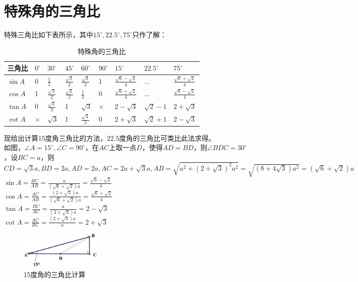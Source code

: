 \documentclass{ecnuthesis}
\begin{document}
\section{特殊角的三角比}
\begin{knowledge}
    特殊三角比如下表所示，其中$15^\circ,22.5^\circ,75^\circ$只作了解：
\end{knowledge}
\begin{table}[H]
\centering
\caption{特殊角的三角比}
\begin{tabular}{l|l|l|l|l|l|l|l|l}
\hline
\hline
三角比 & $0^\circ$ & $30^\circ$ & $45^\circ$ & $60^\circ$ & $90^\circ$ & $15^\circ$ & $22.5^\circ$ & $75^\circ$ \\
\hline
$\sin A$ & 0 & $\frac{1}{2}$ & $\frac{\sqrt 2}{2}$ & $\frac{\sqrt3}{2}$ & 1 & $\frac{\sqrt 6-\sqrt 2}{4}$ & ... & $\frac{\sqrt 6+\sqrt 2}{4}$\\
\hline
$\cos A$ & 1 & $\frac{\sqrt3}{2}$ & $\frac{\sqrt 2}{2}$ & $\frac{1}{2}$ & 0 & $\frac{\sqrt 6+\sqrt 2}{4}$ & ... & $\frac{\sqrt 6-\sqrt 2}{4}$\\
\hline
$\tan A$ & 0 & $\frac{\sqrt3}{3}$ & 1 & $\sqrt3$ & $\times$ & $2-\sqrt 3 $ & $\sqrt2 - 1$ & $2+\sqrt 3$\\
\hline
$\cot A$ & $\times$ & $\sqrt3$ & 1 & $\frac{\sqrt3}{3}$ & 0 & $2+\sqrt 3 $ & $\sqrt2 + 1$ & $2-\sqrt 3$\\
\hline
\hline
\end{tabular}
\end{table}
\begin{knowledge}
    现给出计算15度角三角比的方法，22.5度角的三角比可类比此法求得。\\
    如图，$\angle A=15^\circ,\angle C=90^\circ$，在$AC$上取一点$D$，使得$AD=BD$，则$\angle BDC=30^\circ$，设$BC=a$，则$CD=\sqrt3 a,BD=2a,AD=2a,AC=2a+\sqrt3 a,AB=\sqrt{a^2+(2+\sqrt3)^2a^2}=\sqrt{(8+4\sqrt3)a^2}=(\sqrt6+\sqrt2)a$ \\
    $\sin A=\frac{BC}{AB}=\frac{a}{(\sqrt6+\sqrt2)a}=\frac{\sqrt6-\sqrt2}{4}$ \\
    $\cos A=\frac{AC}{AB}=\frac{(2+\sqrt3)a}{(\sqrt6+\sqrt2)a}=\frac{\sqrt6+\sqrt2}{4}$ \\
    $\tan A=\frac{BC}{AC}=\frac{a}{(2+\sqrt3)a}=2-\sqrt3 $ \\
    $\cot A=\frac{AC}{BC}=\frac{(2+\sqrt3)a}{a}=2+\sqrt3 $ \\
\end{knowledge}
\begin{figure}[H]
\centering
\includegraphics[width=4cm]{picture/906.png}
\caption{15度角的三角比计算}
\end{figure}
\clearpage
\end{document}

